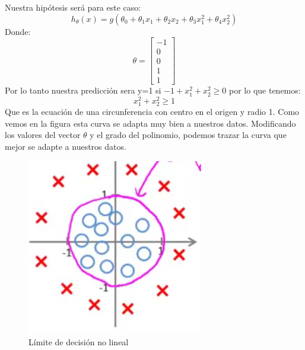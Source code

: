 \documentclass{report}
\begin{document}
Nuestra hipótesis será para este caso:
\[
h_\theta(x)=g(\theta_0+\theta_1x_1+\theta_2x_2+\theta_3x_1^2+\theta_4x_2^2)
\]
Donde:
\[
\theta=\left[\begin{array}{c}
-1\\0\\0\\1\\1
\end{array}\right]
\]
Por lo tanto nuestra predicción sera y=1 si $ -1+x_1^2+x_2^2\geq0 $ por lo que tenemos:\[
x_1^2+x_2^2\geq1
\]
Que es la ecuación de una circunferencia con centro en el origen y radio 1. Como vemos en la figura esta curva se adapta muy bien a nuestros datos. Modificando los valores del vector $ \theta $ y el grado del polinomio, podemos trazar la curva que mejor se adapte a nuestros datos.
\begin{figure}[h]
	\centering
	\includegraphics[scale=0.5]{img/DB3}
	\caption{Límite de decisión no lineal}
	\label{Fig:DB3}
\end{figure}
\end{document}
